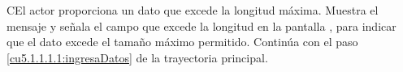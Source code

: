  \begin{UCtrayectoriaA}{C}{El actor proporciona un dato que excede la longitud máxima.}
    \UCpaso[\UCsist] Muestra el mensaje  y señala el campo que excede la 
    longitud en la pantalla , para indicar que el dato excede el tamaño máximo permitido.
    \UCpaso[] Continúa con el paso \ref{cu5.1.1.1.1:ingresaDatos} de la trayectoria principal.
 \end{UCtrayectoriaA}

  
